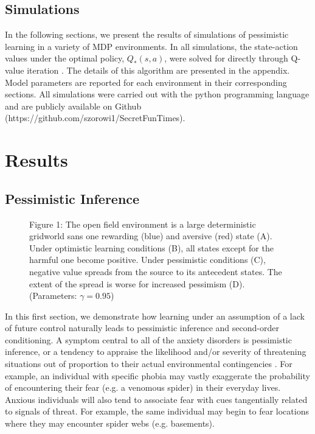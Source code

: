 \documentclass[11pt]{article} %
\begin{document}
\subsection{Simulations}

In the following sections, we present the results of simulations of pessimistic
learning in a variety of MDP environments. In all simulations, the state-action
values under the optimal policy, $Q_*(s,a)$, were solved for directly through
Q-value iteration \citep{SuttonBarto1998,SuttonBarto1998,bertsekas2005}. The
details of this algorithm are presented in the appendix. Model parameters are
reported for each environment in their corresponding sections. All simulations
were carried out with the python programming language and are publicly available
on Github (https://github.com/szorowi1/SecretFunTimes).

\section{Results}

\subsection{Pessimistic Inference}

\begin{figure}
  \centerline{%
  }
  \par Figure 1: The open field environment is a large deterministic gridworld sans one rewarding
  (blue) and aversive (red) state (A). Under optimistic learning conditions (B), all states except
  for the harmful one become positive. Under pessimistic conditions (C), negative value spreads
  from the source to its antecedent states. The extent of the spread is worse for increased
  pessimism (D). (Parameters: $\gamma = 0.95$)
\end{figure}

In this first section, we demonstrate how learning under an assumption of a lack
of future control naturally leads to pessimistic inference and second-order conditioning.
A symptom central to all of the anxiety disorders is pessimistic inference,
or a tendency to appraise the likelihood and/or severity of threatening situations
out of proportion to their actual environmental contingencies \citep{dsm5, BeckClark1997,
ClarkBeck2011}. For example, an individual with specific phobia may vastly exaggerate
the probability of encountering their fear (e.g. a venomous spider) in their
everyday lives. Anxious individuals will also tend to associate fear with cues
tangentially related to signals of threat. For example, the same individual may
begin to fear locations where they may encounter spider webs (e.g. basements).
\end{document}
